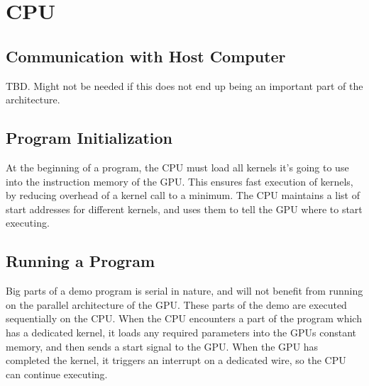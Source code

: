 \chapter{CPU}



\section{Communication with Host Computer}
TBD. Might not be needed if this does not end up being an important part of the architecture.



\section{Program Initialization}
At the beginning of a program, the CPU must load all kernels it's going to use into the instruction memory of the GPU. This ensures fast execution of kernels, by reducing overhead of a kernel call to a minimum.
The CPU maintains a list of start addresses for different kernels, and uses them to tell the GPU where to start executing.

\section{Running a Program}
Big parts of a demo program is serial in nature, and will not benefit from running on the parallel architecture of the GPU.
These parts of the demo are executed sequentially on the CPU.
When the CPU encounters a part of the program which has a dedicated kernel,
it loads any required parameters into the GPUs constant memory, and then sends a start signal to the GPU.
When the GPU has completed the kernel, it triggers an interrupt on a dedicated wire,
so the CPU can continue executing.
